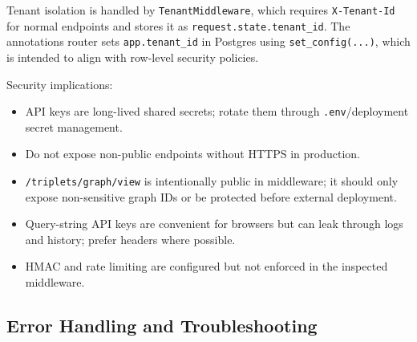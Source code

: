 \documentclass[10pt,letterpaper]{article}
\begin{document}
Tenant isolation is handled by \texttt{TenantMiddleware}, which requires \texttt{X-Tenant-Id} for normal endpoints and stores it as \texttt{request.state.tenant\_id}. The annotations router sets \texttt{app.tenant\_id} in Postgres using \texttt{set\_config(...)}, which is intended to align with row-level security policies.

Security implications:

\begin{itemize}
\item API keys are long-lived shared secrets; rotate them through \texttt{.env}/deployment secret management.
\item Do not expose non-public endpoints without HTTPS in production.
\item \texttt{/triplets/graph/view} is intentionally public in middleware; it should only expose non-sensitive graph IDs or be protected before external deployment.
\item Query-string API keys are convenient for browsers but can leak through logs and history; prefer headers where possible.
\item HMAC and rate limiting are configured but not enforced in the inspected middleware.
\end{itemize}

\subsection{Error Handling and Troubleshooting}
\end{document}
